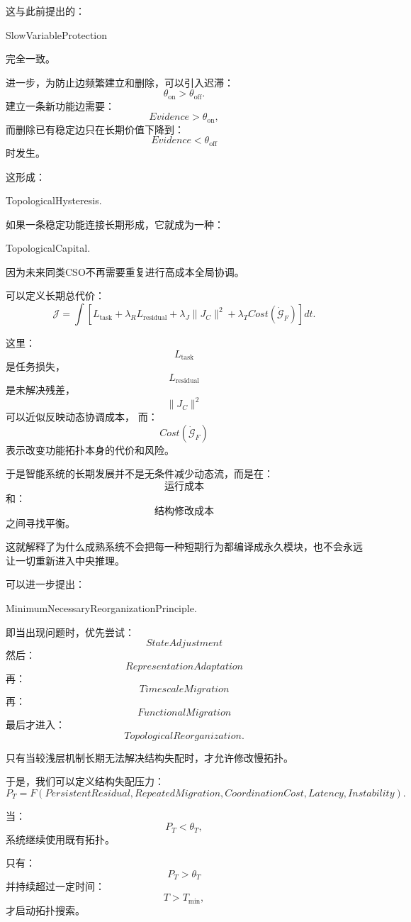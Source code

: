 这与此前提出的：
\begin{statementbox}
SlowVariableProtection
\end{statementbox}
完全一致。

进一步，为防止边频繁建立和删除，可以引入迟滞：
\[
\theta_{\text{on}}
>
\theta_{\text{off}}.
\]
建立一条新功能边需要：
\[
Evidence>\theta_{\text{on}},
\]
而删除已有稳定边只在长期价值下降到：
\[
Evidence<\theta_{\text{off}}
\]
时发生。

这形成：
\begin{statementbox}
TopologicalHysteresis.
\end{statementbox}

如果一条稳定功能连接长期形成，它就成为一种：
\begin{statementbox}
TopologicalCapital.
\end{statementbox}
因为未来同类CSO不再需要重复进行高成本全局协调。

可以定义长期总代价：
\[
\mathcal J
=
\int
\left[
L_{\text{task}}
+
\lambda_RL_{\text{residual}}
+
\lambda_J\|J_C\|^2
+
\lambda_TCost(\dot{\mathcal G}_F)
\right]dt.
\]

这里：
\[
L_{\text{task}}
\]
是任务损失，
\[
L_{\text{residual}}
\]
是未解决残差，
\[
\|J_C\|^2
\]
可以近似反映动态协调成本，
而：
\[
Cost(\dot{\mathcal G}_F)
\]
表示改变功能拓扑本身的代价和风险。

于是智能系统的长期发展并不是无条件减少动态流，而是在：
\[
\text{运行成本}
\]
和：
\[
\text{结构修改成本}
\]
之间寻找平衡。

这就解释了为什么成熟系统不会把每一种短期行为都编译成永久模块，也不会永远让一切重新进入中央推理。

可以进一步提出：
\begin{statementbox}
MinimumNecessaryReorganizationPrinciple.
\end{statementbox}

即当出现问题时，优先尝试：
\[
StateAdjustment
\]
然后：
\[
RepresentationAdaptation
\]
再：
\[
TimescaleMigration
\]
再：
\[
FunctionalMigration
\]
最后才进入：
\[
TopologicalReorganization.
\]

只有当较浅层机制长期无法解决结构失配时，才允许修改慢拓扑。

于是，我们可以定义结构失配压力：
\[
P_T
=
F
\left(
PersistentResidual,
RepeatedMigration,
CoordinationCost,
Latency,
Instability
\right).
\]

当：
\[
P_T<\theta_T,
\]
系统继续使用既有拓扑。

只有：
\[
P_T>\theta_T
\]
并持续超过一定时间：
\[
T>T_{\min},
\]
才启动拓扑搜索。


